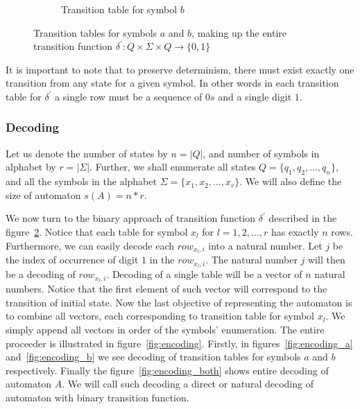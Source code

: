 \documentclass{article}
\begin{document}
\begin{figure}[H]
\begin{center}
\begin{subfigure}{.5\textwidth}
\begin{tabular}{|P{1.0cm} || P{0.8cm} | P{0.8cm} | P{0.8cm} | P{0.8cm}|}
	\end{tabular}
	
	\caption{Transition table for symbol $b$}
	\label{fig:ttable_bin_b}
	
	\end{subfigure}%

	
\caption{Transition tables for symbols $a$ and $b$, making up the entire transition function $\delta^{'}: Q \times \Sigma \times Q \rightarrow \{0,1\}$}

\label{fig:ttable_bin}
\end{center}
\end{figure}

It is important to note that to preserve determinism, there must exist exactly one transition from any state for a given symbol. In other words in each transition table for $\delta^{'}$ a single row must be a sequence of $0s$ and a single digit $1$.

\subsubsection{Decoding} \label{sec:auto_dec}

Let us denote the number of states by $n = |Q|$, and number of symbols in alphabet by $r = |\Sigma|$. Further, we shall enumerate all states 	$Q = \{q_1, q_2, \ldots, q_n\}$, and all the symbols in the alphabet 	$\Sigma = \{x_1, x_2, \ldots, x_r\}$. We will also define the size of automaton $s(A) = n*r$.

We now turn to the binary approach of transition function $\delta^{'}$ described in the figure~\ref{fig:ttable_bin}. Notice that each table for symbol $x_l$ for $l = 1,2, \dots, r$ has exactly $n$ rows. Furthermore, we can easily decode each $row_{x_l, i}$ into a natural number. Let $j$ be the index of occurrence of digit $1$ in the $row_{x_l, i}$. The natural number $j$ will then be a decoding of $row_{x_l, i}$. Decoding of a single table will be a vector of $n$ natural numbers. Notice that the first element of such vector will correspond to the transition of initial state. Now the last objective of representing the automaton is to combine all vectors, each corresponding to transition table for symbol $x_{l}$. We simply append all vectors in order of the symbols' enumeration. The entire proceeder is illustrated in figure~\ref{fig:encoding}. Firstly, in figures~\ref{fig:encoding_a} and~\ref{fig:encoding_b} we see decoding of transition tables for symbols $a$ and $b$ respectively. Finally the figure~\ref{fig:encoding_both} shows entire decoding of automaton $A$. We will call such decoding a direct or natural decoding of automaton with binary transition function.
\end{document}
